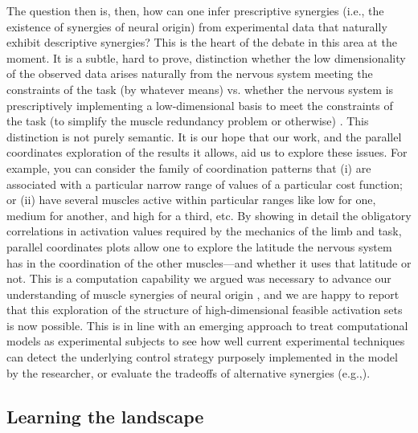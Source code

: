 \documentclass[10pt,letterpaper]{article}
\begin{document}
The question then is, then, how can one infer prescriptive synergies (i.e., the existence of synergies of neural origin) from experimental data that naturally exhibit descriptive synergies? This is the heart of the debate in this area at the moment. It is  a subtle, hard to prove, distinction whether the low dimensionality of the observed data arises naturally  from the nervous system meeting the constraints of the task (by whatever means) vs. whether the nervous system is prescriptively implementing a low-dimensional basis to meet the constraints of the task (to simplify the muscle redundancy problem or otherwise) \cite{tresch2009case,kutch2012challenges,deRugy2013aremusclesynergiesuseful}.  This distinction is not purely semantic. It is our hope that our work, and the parallel coordinates exploration of the results it allows, aid us to explore these issues. For example, you can consider  the family of coordination patterns that  (i) are associated with a particular narrow range of values of a particular cost function; or (ii) have several muscles active within  particular ranges like low for one, medium for  another, and high for a third, etc. By showing in detail the obligatory correlations in activation values required by the mechanics of the limb and task,  parallel coordinates plots allow one to explore the latitude the nervous system has in the coordination of the other muscles---and whether it uses that latitude or not.  This is a computation capability we argued was necessary to advance our understanding of muscle synergies of neural origin \cite{kutch2012challenges}, and we are happy to report that this exploration of the structure of high-dimensional feasible activation sets is now possible. This is in line with an emerging  approach to treat computational models as experimental subjects to see how well current experimental techniques can detect the underlying  control strategy purposely implemented in the model by the researcher, or evaluate the tradeoffs of alternative synergies (e.g.,\cite{kutch2012challenges,alessandro2013musclesynergies,burkholder2013practical,moghadam2013well,steele2015consequences,ting1999phase}). 

\subsection*{Learning the landscape}
\end{document}
